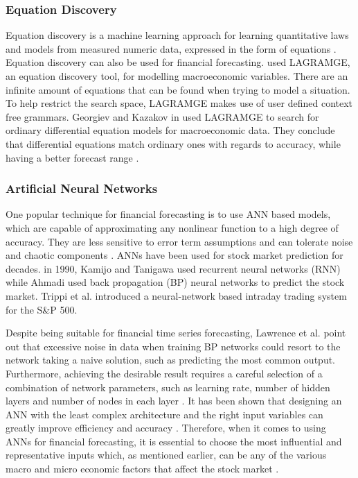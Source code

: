 \documentclass{UoYCSproject}
\begin{document}
\subsubsection{Equation Discovery}
Equation discovery is a machine learning approach for learning quantitative laws and models from measured numeric data, expressed in the form of equations \cite{Todorovski2010}. Equation discovery can also be used for financial forecasting.  \cite{kazakov2008equation}  used LAGRAMGE, an equation discovery tool, for modelling macroeconomic variables. There are an infinite amount of equations that can be found when trying to model a situation. To help restrict the search space, LAGRAMGE makes use of user defined context free grammars. Georgiev and Kazakov in \cite{Georgiev2012Equation} used LAGRAMGE to search for ordinary differential equation models for macroeconomic data. They conclude that differential equations match ordinary ones with regards to accuracy, while having a better forecast range \cite{Kokov2012Equation}.  

\subsubsection{Artificial Neural Networks}
One popular technique for financial forecasting is to use ANN based models, which are capable of approximating any nonlinear function to a high degree of accuracy. They are less sensitive to error term assumptions and can tolerate noise and chaotic components \cite{majhi2007stock}. ANNs have been used for stock market prediction for decades. in 1990, Kamijo and Tanigawa \cite{kamijo1990stock} used recurrent neural networks (RNN) while Ahmadi \cite{ahmadi1990testability} used back propagation (BP) neural networks to predict the stock market. Trippi et al. \cite{trippi1992trading} introduced a neural-network based intraday trading system for the S\&P 500. 

Despite being suitable for financial time series forecasting, Lawrence et al. \cite{lawrence1998noisy} point out that excessive noise in data when training BP networks could resort to the network taking a naive solution, such as predicting the most common output. Furthermore, achieving the desirable result requires a careful selection of a combination of network parameters, such as learning rate, number of hidden layers and number of nodes in each layer \cite{hussain2008financial}. It has been shown that designing an ANN with the least complex architecture and the right input variables can greatly improve efficiency and accuracy \cite{atsalakis2009surveying}. Therefore, when it comes to using ANNs for financial forecasting, it is essential to choose the most influential and representative inputs which, as mentioned earlier, can be any of the various macro and micro economic factors that affect the stock market \cite{zhong2017forecasting}. 
\end{document}
